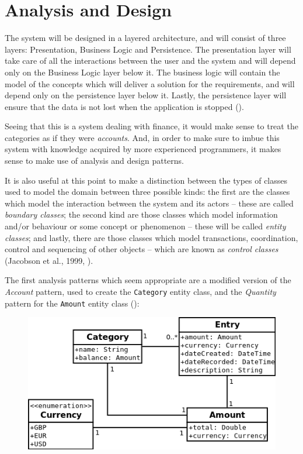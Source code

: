 \section{Analysis and Design} \label{sec:Design}

The system will be designed in a layered architecture, and will consist of
three layers: Presentation, Business Logic and Persistence. The presentation
layer will take care of all the interactions between the user and the system
and will depend only on the Business Logic layer below it. The business logic
will contain the model of the concepts which will deliver a solution for the
requirements, and will depend only on the persistence layer below it. Lastly,
the persistence layer will ensure that the data is not lost when the
application is stopped (\cite[][p.~32-33]{bauer2016hibernate}).

Seeing that this is a system dealing with finance, it would make sense to treat
the categories as if they were \emph{accounts}. And, in order to make sure to
imbue this system with knowledge acquired by more experienced programmers, it
makes sense to make use of analysis and design patterns.

It is also useful at this point to make a distinction between the types of
classes used to model the domain between three possible kinds: the first are
the classes which model the interaction between the system and its actors --
these are called \emph{boundary classes}; the second kind are those classes
which model information and/or behaviour or some concept or phenomenon -- these
will be called \emph{entity classes}; and lastly, there are those classes which
model transactions, coordination, control and sequencing of other objects --
which are known as \emph{control classes} (Jacobson et al., 1999,
\cite[cited][pp.~198-201]{bennett2010object}).
%

The first analysis patterns which seem appropriate are a modified version of
the \emph{Account} pattern, used to create the \texttt{Category} entity class,
and the \emph{Quantity} pattern for the \texttt{Amount} entity class
(\cite[][Sections~6.1~\&~3.1]{fowler1997analysis}):
\begin{figure}[ht!]
  \begin{center}
    \includegraphics[width=12cm]{./contents/img/Class_Diagram_-_Categories_and_Amount.png}
  \end{center}
  \caption{}
  \label{fig:ClassDiagram.CategoriesAndAmount}
\end{figure}
\FloatBarrier

